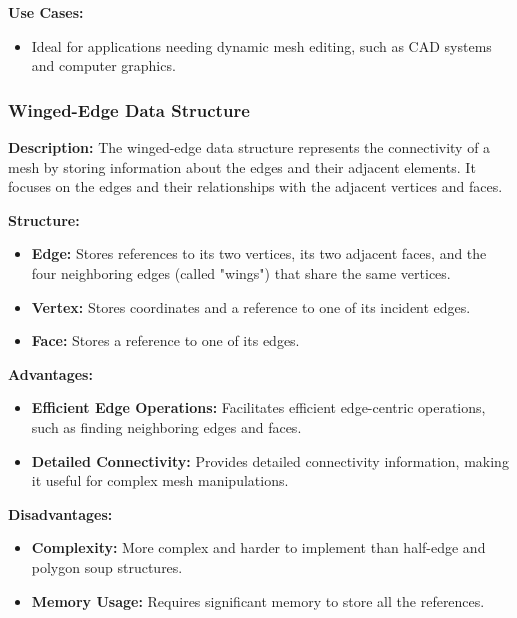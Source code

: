 \documentclass{article}
\begin{document}
\textbf{Use Cases:}

\begin{itemize}
    \item Ideal for applications needing dynamic mesh editing, such as CAD systems and computer graphics.
\end{itemize}

\subsubsection{Winged-Edge Data Structure}

\textbf{Description:} The winged-edge data structure represents the connectivity of a mesh by storing information about the edges and their adjacent elements. It focuses on the edges and their relationships with the adjacent vertices and faces.

\textbf{Structure:}

\begin{itemize}
    \item \textbf{Edge:} Stores references to its two vertices, its two adjacent faces, and the four neighboring edges (called "wings") that share the same vertices.
    \item \textbf{Vertex:} Stores coordinates and a reference to one of its incident edges.
    \item \textbf{Face:} Stores a reference to one of its edges.
\end{itemize}

\textbf{Advantages:}

\begin{itemize}
    \item \textbf{Efficient Edge Operations:} Facilitates efficient edge-centric operations, such as finding neighboring edges and faces.
    \item \textbf{Detailed Connectivity:} Provides detailed connectivity information, making it useful for complex mesh manipulations.
\end{itemize}

\textbf{Disadvantages:}

\begin{itemize}
    \item \textbf{Complexity:} More complex and harder to implement than half-edge and polygon soup structures.
    \item \textbf{Memory Usage:} Requires significant memory to store all the references.
\end{itemize}
\end{document}
